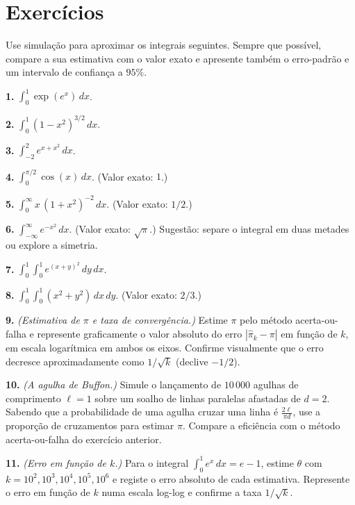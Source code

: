 \documentclass[
  portuguese,
  11pt,
  openany]{book}
\begin{document}
\section{Exercícios}\label{exercuxedcios-37}

Use simulação para aproximar os integrais seguintes. Sempre que possível,
compare a sua estimativa com o valor exato e apresente também o erro-padrão e um
intervalo de confiança a \(95\%\).

\textbf{1.} \(\displaystyle\int_{0}^{1} \exp(e^x)\, dx\).

\textbf{2.} \(\displaystyle\int_{0}^{1} (1 - x^2)^{3/2}\, dx\).

\textbf{3.} \(\displaystyle\int_{-2}^{2} e^{x + x^2}\, dx\).

\textbf{4.} \(\displaystyle\int_{0}^{\pi/2} \cos(x)\, dx\). (Valor exato: \(1\).)

\textbf{5.} \(\displaystyle\int_{0}^{\infty} x\,(1 + x^2)^{-2}\, dx\). (Valor exato:
\(1/2\).)

\textbf{6.} \(\displaystyle\int_{-\infty}^{\infty} e^{-x^2}\, dx\). (Valor exato:
\(\sqrt{\pi}\).) Sugestão: separe o integral em duas metades ou explore a simetria.

\textbf{7.} \(\displaystyle\int_{0}^{1}\!\int_{0}^{1} e^{(x+y)^2}\, dy\, dx\).

\textbf{8.} \(\displaystyle\int_{0}^{1}\!\int_{0}^{1} (x^2 + y^2)\, dx\, dy\). (Valor
exato: \(2/3\).)

\textbf{9.} \emph{(Estimativa de \(\pi\) e taxa de convergência.)} Estime \(\pi\) pelo método
acerta-ou-falha e represente graficamente o valor absoluto do erro
\(|\hat{\pi}_k - \pi|\) em função de \(k\), em escala logarítmica em ambos os eixos.
Confirme visualmente que o erro decresce aproximadamente como \(1/\sqrt{k}\)
(declive \(-1/2\)).

\textbf{10.} \emph{(A agulha de Buffon.)} Simule o lançamento de \(10\,000\) agulhas de
comprimento \(\ell = 1\) sobre um soalho de linhas paralelas afastadas de \(d = 2\).
Sabendo que a probabilidade de uma agulha cruzar uma linha é
\(\frac{2\ell}{\pi d}\), use a proporção de cruzamentos para estimar \(\pi\). Compare
a eficiência com o método acerta-ou-falha do exercício anterior.

\textbf{11.} \emph{(Erro em função de \(k\).)} Para o integral \(\int_0^1 e^x\, dx = e - 1\),
estime \(\theta\) com \(k = 10^2, 10^3, 10^4, 10^5, 10^6\) e registe o erro absoluto
de cada estimativa. Represente o erro em função de \(k\) numa escala log-log e
confirme a taxa \(1/\sqrt{k}\).
\end{document}
